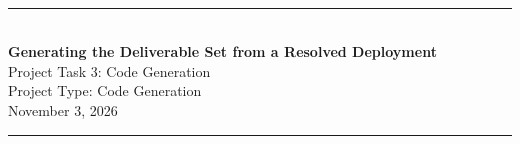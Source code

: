 \begin{titlepage}

\newcommand{\HRule}{\rule{\linewidth}{0.5mm}}
\begin{center}
~\vspace{2cm}

\HRule \\[0.6cm]
\textbf{\LARGE Generating the Deliverable Set from a Resolved Deployment} \\[0.3cm]
Project Task 3: Code Generation \\
Project Type: Code Generation \\
November 3, 2026\\[0.4cm]
\HRule \\[1.2cm]
\\[0.4cm]
\\
\\
\end{center}
\newpage
\end{titlepage}

